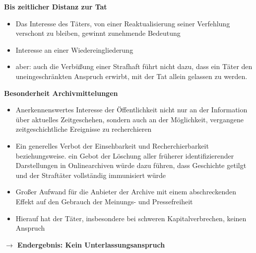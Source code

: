\textbf{Bis zeitlicher Distanz zur Tat}
\begin{itemize}
    \item Das Interesse des Täters, von einer Reaktualisierung seiner Verfehlung verschont zu bleiben, gewinnt zunehmende Bedeutung
    \item Interesse an einer Wiedereingliederung
    \item aber: auch die Verbüßung einer Strafhaft führt nicht dazu, dass ein Täter den uneingeschränkten Anspruch erwirbt, mit der Tat \glqq{}allein gelassen zu werden\grqq{}.
\end{itemize}
\textbf{Besonderheit Archivmittelungen}
\begin{itemize}
    \item Anerkennenswertes Interesse der Öffentlichkeit nicht nur an der Information über aktuelles Zeitgeschehen, sondern auch an der Möglichkeit, vergangene zeitgeschichtliche Ereignisse zu recherchieren
    \item Ein generelles Verbot der Einsehbarkeit und Recherchierbarkeit beziehungsweise. ein Gebot der Löschung aller früherer identifizierender Darstellungen in Onlinearchiven würde dazu führen, dass Geschichte getilgt und der Straftäter vollständig immunisiert würde
    \item Großer Aufwand für die Anbieter der Archive mit einem abschreckenden Effekt auf den Gebrauch der Meinungs- und Pressefreiheit
    \item Hierauf hat der Täter, insbesondere bei schweren Kapitalverbrechen, keinen Anspruch
\end{itemize}
\textbf{$\rightarrow$ Endergebnis: Kein Unterlassungsanspruch}
%
%
%
